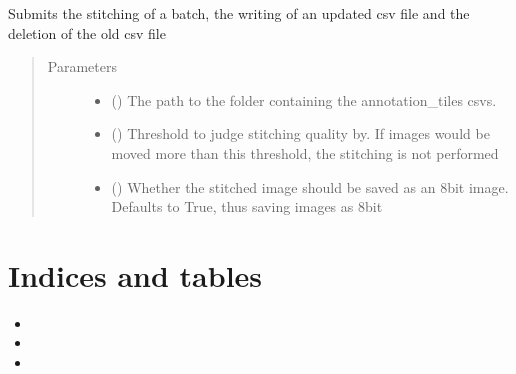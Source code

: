 \documentclass[letterpaper,10pt,english]{sphinxmanual}
\begin{document}
\begin{fulllineitems}
\begin{fulllineitems}
\end{fulllineitems}


\begin{fulllineitems}
\label{\detokenize{index:stitch_MAPS_annotations.Stitcher.stitch_batch}}
Submits the stitching of a batch, the writing of an updated csv file and the deletion of the old csv file
\begin{quote}\begin{description}
\item[{Parameters}] \leavevmode\begin{itemize}
\item {} 
 () \textendash{} The path to the folder containing the annotation\_tiles csvs.

\item {} 
 () \textendash{} Threshold to judge stitching quality by. If images would be moved more than this
threshold, the stitching is not performed

\item {} 
 () \textendash{} Whether the stitched image should be saved as an 8bit image. Defaults to True, thus saving
images as 8bit

\end{itemize}

\end{description}\end{quote}

\end{fulllineitems}


\end{fulllineitems}



\chapter{Indices and tables}
\label{\detokenize{index:indices-and-tables}}\begin{itemize}
\item {} 

\item {} 

\item {} 

\end{itemize}
\end{document}
